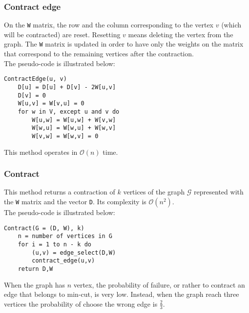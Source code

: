 \subsubsection*{Contract edge}
On the \verb|W| matrix, the row and the column corresponding to the vertex $v$ (which will be contracted) are reset. Resetting $v$ means deleting the vertex from the graph. The \verb|W| matrix is updated in order to have only the weights on the matrix that correspond to the remaining vertices after the contraction.\\
The pseudo-code is illustrated below:
\begin{verbatim}
ContractEdge(u, v)
    D[u] = D[u] + D[v] - 2W[u,v]
    D[v] = 0
    W[u,v] = W[v,u] = 0
    for w in V, except u and v do
        W[u,w] = W[u,w] + W[v,w]
        W[w,u] = W[w,u] + W[w,v]
        W[v,w] = W[w,v] = 0
\end{verbatim}
This method operates in $\mathcal{O}(n)$ time.

\subsubsection*{Contract}
This method returns a contraction of $k$ vertices of the graph $\mathcal{G}$ represented with the \verb|W| matrix and the vector \verb|D|. Its complexity is $\mathcal{O}(n^2)$.\\
The pseudo-code is illustrated below:
\begin{verbatim}
Contract(G = (D, W), k)
    n = number of vertices in G
    for i = 1 to n - k do
        (u,v) = edge_select(D,W)
        contract_edge(u,v)
    return D,W
\end{verbatim}
When the graph has $n$ vertex, the probability of failure, or rather to contract an edge that belongs to min-cut, is very low. Instead, when the graph reach three vertices the probability of choose the wrong edge is $\frac{2}{3}$.

